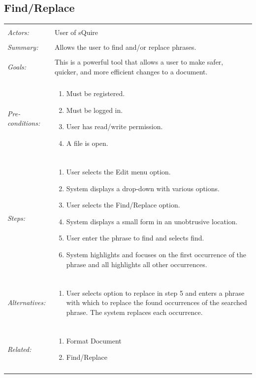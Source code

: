 \documentclass[11pt]{report}
\begin{document}
\subsection{Find/Replace}
\begin{tabular}{ p{2cm} p{12cm} }
\hline
\\
	\textit{Actors:} & User of sQuire \\
	\\
	\textit{Summary:} &  Allows the user to find and/or replace phrases. \\
	\\
	\textit{Goals:} & This is a powerful tool that allows a user to make safer, quicker, and more efficient changes to a document. \\
	\\
	\textit{Pre-conditions:} &  \begin{enumerate}
		\item Must be registered.
		\item Must be logged in.
		\item User has read/write permission.
		\item A file is open.
	\end{enumerate}\\
	\\
	\textit{Steps:} & \begin{enumerate}
		\item User selects the Edit menu option.
		\item System displays a drop-down with various options.
		\item User selects the Find/Replace option.
		\item System displays a small form in an unobtrusive location.
		\item User enter the phrase to find and selects find.
		\item System highlights and focuses on the first occurrence of the phrase and all highlights all other occurrences.
	\end{enumerate} \\
	\\
	\textit{Alternatives:} & \begin{enumerate}
		\item User selects option to replace in step 5 and enters a phrase with which to replace the found occurrences of the searched phrase. The system replaces each occurrence.
	\end{enumerate} \\
	\\
	\textit{Related:} & \begin{enumerate}
		\item Format Document
		\item Find/Replace
	\end{enumerate} \\
	\\
\hline
\end{tabular}
\newpage
\end{document}
